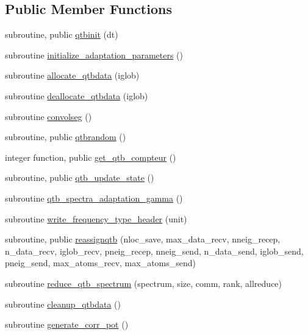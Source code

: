 \subsection*{Public Member Functions}
\begin{DoxyCompactItemize}
\item 
subroutine, public \hyperlink{classqtb_ae6f7f437061f1fb54111f71541551610}{qtbinit} (dt)
\item 
subroutine \hyperlink{classqtb_ad311bf99780817a99d85d8dc60b2f0f8}{initialize\-\_\-adaptation\-\_\-parameters} ()
\item 
subroutine \hyperlink{classqtb_ad75e237b959399de40ff9770628cc9e2}{allocate\-\_\-qtbdata} (iglob)
\item 
subroutine \hyperlink{classqtb_afc438bdbd7f915d2f29c36dc9a41e500}{deallocate\-\_\-qtbdata} (iglob)
\item 
subroutine \hyperlink{classqtb_ab833c16191b0a4ab56314b04f9ba808e}{convolseg} ()
\item 
subroutine, public \hyperlink{classqtb_a93f0e167c4980bd190a1a2dcb6ecfa19}{qtbrandom} ()
\item 
integer function, public \hyperlink{classqtb_aa62774b816b6b39df364ba19503768e9}{get\-\_\-qtb\-\_\-compteur} ()
\item 
subroutine, public \hyperlink{classqtb_a6cca410de146cb9f472943484be133fb}{qtb\-\_\-update\-\_\-state} ()
\item 
subroutine \hyperlink{classqtb_aff51e8e681c6042f045a9803ec35fd77}{qtb\-\_\-spectra\-\_\-adaptation\-\_\-gamma} ()
\item 
subroutine \hyperlink{classqtb_ab80d433a778590bea099c2b40f1aa08c}{write\-\_\-frequency\-\_\-type\-\_\-header} (unit)
\item 
subroutine, public \hyperlink{classqtb_a1127e6bd0d1afbc20d0b0387617ef816}{reassignqtb} (nloc\-\_\-save, max\-\_\-data\-\_\-recv, nneig\-\_\-recep, n\-\_\-data\-\_\-recv, iglob\-\_\-recv, pneig\-\_\-recep, nneig\-\_\-send, n\-\_\-data\-\_\-send, iglob\-\_\-send, pneig\-\_\-send, max\-\_\-atoms\-\_\-recv, max\-\_\-atoms\-\_\-send)
\item 
subroutine \hyperlink{classqtb_a8fbfafdc7282eaf23a02db91984d7a99}{reduce\-\_\-qtb\-\_\-spectrum} (spectrum, size, comm, rank, allreduce)
\item 
subroutine \hyperlink{classqtb_a9913767a9077cb7c9b0141413a55bf8d}{cleanup\-\_\-qtbdata} ()
\item 
subroutine \hyperlink{classqtb_ab102bd090bf1ab3aa9d0013e16cacf16}{generate\-\_\-corr\-\_\-pot} ()
\item 

\end{DoxyCompactItemize}
